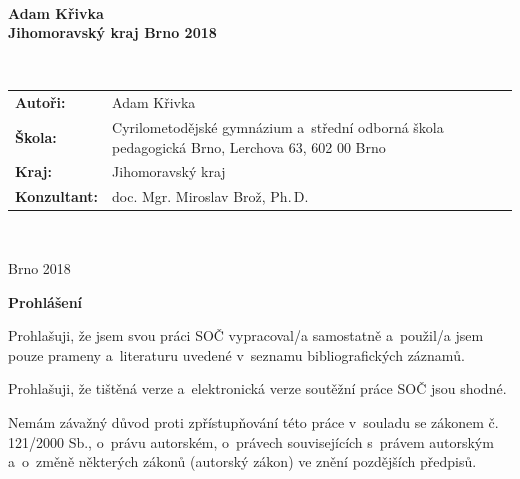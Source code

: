 \documentclass[A4paper, 12pt, oneside]{book}
\begin{document}
\pagestyle{empty}
\begin{center}
	{\fontsize{18pt}{22pt}\selectfont {}} \\
	{\fontsize{14pt}{17pt}\selectfont {}}
\end{center}
\vfill
\begin{center}
	{\fontsize{20pt}{26pt}\selectfont {}}
\end{center}
\vfill
{\large \bfseries Adam Křivka \\
	Jihomoravský kraj \hfill Brno 2018}
\newpage

\begin{center}
	{\fontsize{18pt}{22pt}\selectfont {}} \\
	{\fontsize{14pt}{17pt}\selectfont {}}
\end{center}
\vfill
\begin{center}
	{\fontsize{20pt}{26pt}\selectfont {}}

	 {\fontsize{20pt}{26pt}\selectfont {}}
\end{center}
\vfill
\begin{tabularx}{\textwidth}{lX}
	{\bfseries Autoři:} & Adam Křivka \\
	{\bfseries Škola:} & Cyrilometodějské gymnázium a~střední odborná škola pedagogická Brno, Lerchova 63, 602 00 Brno \\
	{\bfseries Kraj:} & Jihomoravský kraj \\
	{\bfseries Konzultant:} & doc. Mgr. Miroslav Brož, Ph.\,D.
\end{tabularx}

\

\noindent Brno 2018

\newpage

{\large \bfseries Prohlášení}

Prohlašuji, že jsem svou práci SOČ vypracoval/a samostatně a~použil/a jsem pouze prameny a~literaturu uvedené v~seznamu bibliografických záznamů.

Prohlašuji, že tištěná verze a~elektronická verze soutěžní práce SOČ jsou shodné. 

Nemám závažný důvod proti zpřístupňování této práce v~souladu se zákonem č. 121/2000 Sb., o~právu autorském, o~právech souvisejících s~právem autorským a~o~změně některých zákonů (autorský zákon) ve znění pozdějších předpisů. 
\end{document}

